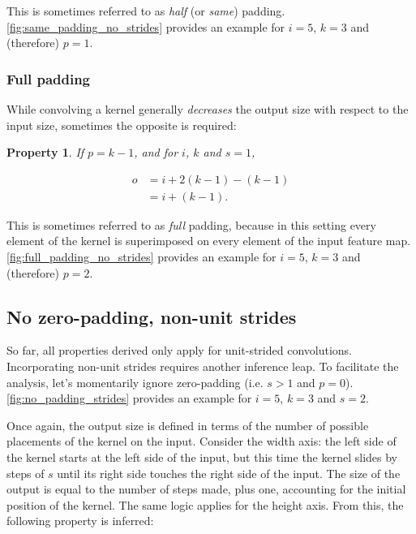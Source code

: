 \documentclass{article}
\newtheorem{prop}{Property}
\begin{document}
This is sometimes referred to as {\em half} (or {\em same}) padding.
\autoref{fig:same_padding_no_strides} provides an example for $i = 5$, $k = 3$
and (therefore) $p = 1$.

\subsubsection{Full padding}

While convolving a kernel generally {\em decreases} the output size with respect
to the input size, sometimes the opposite is required:

\begin{prop}\label{prop:full_padding_no_strides}
If $p = k - 1$, and for $i$, $k$ and $s = 1$,

\begin{equation}
\begin{split}
    o &= i + 2(k - 1) - (k - 1) \\
      &= i + (k - 1).
\end{split}
\end{equation}
\end{prop}

This is sometimes referred to as {\em full} padding, because in this setting
every element of the kernel is superimposed on every element of the input
feature map. \autoref{fig:full_padding_no_strides} provides an example for $i =
5$, $k = 3$ and (therefore) $p = 2$.

\subsection{No zero-padding, non-unit strides}

So far, all properties derived only apply for unit-strided convolutions.
Incorporating non-unit strides requires another inference leap. To facilitate
the analysis, let's momentarily ignore zero-padding (i.e.  $s > 1$ and $p = 0$).
\autoref{fig:no_padding_strides} provides an example for $i = 5$, $k = 3$ and $s
= 2$.

Once again, the output size is defined in terms of the number of possible
placements of the kernel on the input. Consider the width axis: the left side of
the kernel starts at the left side of the input, but this time the kernel slides
by steps of $s$ until its right side touches the right side of the input. The
size of the output is equal to the number of steps made, plus one, accounting
for the initial position of the kernel. The same logic applies for the height
axis. From this, the following property is inferred:
\end{document}
